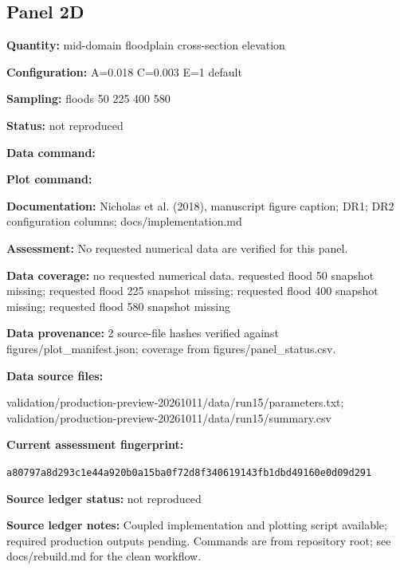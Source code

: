 \subsection*{Panel 2D}
\textbf{Quantity:} mid-domain floodplain cross-section elevation

\textbf{Configuration:} A=0.018 C=0.003 E=1 default

\textbf{Sampling:} floods 50 225 400 580

\textbf{Status:} not reproduced

\textbf{Data command:}\par {\small \texttt{}}\par

\textbf{Plot command:}\par {\small \texttt{}}\par

\textbf{Documentation:} Nicholas et al. (2018), manuscript figure caption; DR1; DR2 configuration columns; docs/\allowbreak{}implementation.md

\textbf{Assessment:} No requested numerical data are verified for this panel.

\textbf{Data coverage:} no requested numerical data. requested flood 50 snapshot missing; requested flood 225 snapshot missing; requested flood 400 snapshot missing; requested flood 580 snapshot missing

\textbf{Data provenance:} 2 source-file hashes verified against figures/\allowbreak{}plot\_\allowbreak{}manifest.json; coverage from figures/\allowbreak{}panel\_\allowbreak{}status.csv.

\textbf{Data source files:}\par {\small\raggedright validation/\allowbreak{}production-preview-20261011/\allowbreak{}data/\allowbreak{}run15/\allowbreak{}parameters.txt; validation/\allowbreak{}production-preview-20261011/\allowbreak{}data/\allowbreak{}run15/\allowbreak{}summary.csv\par}

\textbf{Current assessment fingerprint:}\par {\small\texttt{a80797a8d293c1e44a920b0a15ba0f72d8f340619143fb1dbd49160e0d09d291}}\par

\textbf{Source ledger status:} not reproduced

\textbf{Source ledger notes:} Coupled implementation and plotting script available; required production outputs pending. Commands are from repository root; see docs/\allowbreak{}rebuild.md for the clean workflow.

